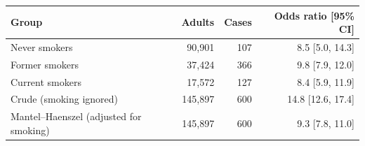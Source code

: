 \begin{tabular}{lrrr}
\toprule
Group & Adults & Cases & Odds ratio [95\% CI] \\
\midrule
Never smokers & 90,901 & 107 & 8.5 [5.0, 14.3] \\
Former smokers & 37,424 & 366 & 9.8 [7.9, 12.0] \\
Current smokers & 17,572 & 127 & 8.4 [5.9, 11.9] \\
\midrule
Crude (smoking ignored) & 145,897 & 600 & 14.8 [12.6, 17.4] \\
Mantel--Haenszel (adjusted for smoking) & 145,897 & 600 & 9.3 [7.8, 11.0] \\
\bottomrule
\end{tabular}
